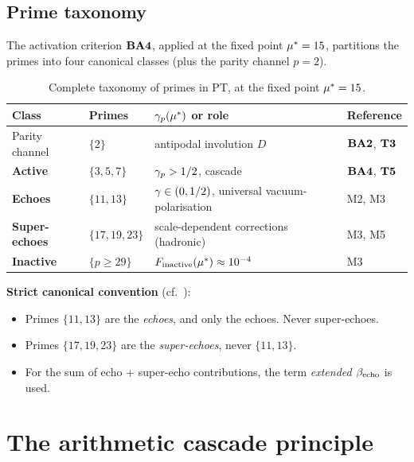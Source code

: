 \subsection{Prime taxonomy}
\label{sec:bridge:taxonomie}

The activation criterion $\textbf{BA4}$, applied at the fixed point $\mu^{*} = 15$, partitions the primes into four canonical classes (plus the parity channel $p = 2$).

\begin{table}[htbp]
\centering
\small
\begin{tabular}{@{}llll@{}}
\toprule
Class & Primes & $\gamma_{p}(\mu^{*})$ or role & Reference \\
\midrule
Parity channel & $\{2\}$ & antipodal involution $D$ & $\textbf{BA2}$, $\textbf{T3}$ \\
\textbf{Active} & $\{3, 5, 7\}$ & $\gamma_{p} > 1/2$, cascade & $\textbf{BA4}$, $\textbf{T5}$ \\
\textbf{Echoes} & $\{11, 13\}$ & $\gamma_{} \in (0, 1/2)$, universal vacuum-polarisation & M2, M3 \\
\textbf{Super-echoes} & $\{17, 19, 23\}$ & scale-dependent corrections (hadronic) & M3, M5 \\
\textbf{Inactive} & $\{p \geq 29\}$ & $F_{\rm inactive}(\mu^{*}) \approx 10^{-4}$ & M3 \\
\bottomrule
\end{tabular}
\caption{Complete taxonomy of primes in PT, at the fixed point $\mu^{*} = 15$.}
\label{tab:taxonomie_en}
\end{table}

\textbf{Strict canonical convention} (cf.~\cite{companion_M2,companion_M3}):
\begin{itemize}[nosep,leftmargin=*]
\item Primes $\{11, 13\}$ are the \emph{echoes}, and only the echoes. Never super-echoes.
\item Primes $\{17, 19, 23\}$ are the \emph{super-echoes}, never $\{11, 13\}$.
\item For the sum of echo + super-echo contributions, the term \emph{extended $\beta_{\rm echo}$} is used.
\end{itemize}

\section{The arithmetic cascade principle}
\label{sec:cascade}

